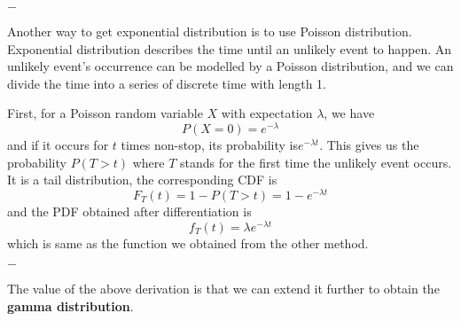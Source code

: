 \documentclass[11pt, a4paper, oneside]{book}
\theoremstyle{definition}
\newcommand{\breaking}{%
    \begin{center}
    $-$
    \end{center}%
}
\begin{document}
\breaking

\noindent Another way to get exponential distribution is to use Poisson distribution. Exponential distribution describes the time until an unlikely event to happen. An unlikely event's occurrence can be modelled by a Poisson distribution, and we can divide the time into a series of discrete time with length 1. 

\noindent First, for a Poisson random variable $X$ with expectation $\lambda$, we have\[
P(X = 0) = e^{-\lambda}
\]
and if it occurs for $t$ times non-stop, its probability is$e^{-\lambda t}$. This gives us the probability $P(T>t)$ where $T$ stands for the first time the unlikely event occurs. It is a tail distribution, the corresponding CDF is \[
F_T(t) = 1 - P(T>t) = 1 - e^{-\lambda t}
\]
and the PDF obtained after differentiation is\[
f_T(t) = \lambda e^{-\lambda t}
\]
which is same as the function we obtained from the other method. 

\breaking

\noindent The value of the above derivation is that we can extend it further to obtain the \textbf{gamma distribution}. 
\end{document}
